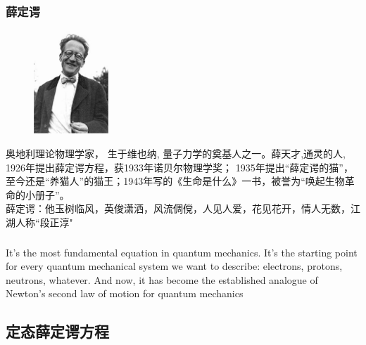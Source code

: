 \begin{frame}
    \frametitle{薛定谔}
    \begin{figure} %
        \includegraphics[width=0.25\textwidth]{figs/schroginger.png}   
    \end{figure}
奥地利理论物理学家， 生于维也纳, 量子力学的奠基人之一。薛天才,通灵的人, 1926年提出薛定谔方程，获1933年诺贝尔物理学奖； 1935年提出“薛定谔的猫”，至今还是“养猫人”的猫王；1943年写的《生命是什么》一书，被誉为“唤起生物革命的小册子”。\\ \vspace{0.3em}
薛定谔：他玉树临风，英俊潇洒，风流倜傥，人见人爱，花见花开，情人无数，江湖人称“段正淳"
\end{frame}

\begin{frame}
    \frametitle{}
    \centering
    {
      \large {It's the most fundamental equation in quantum mechanics. 
      It's the starting point for every quantum mechanical system we want to describe: electrons, protons, neutrons, whatever.
      And now, it has become the established analogue of Newton's second law of motion for quantum mechanics}
    }
\end{frame}

\subsection{定态薛定谔方程}

